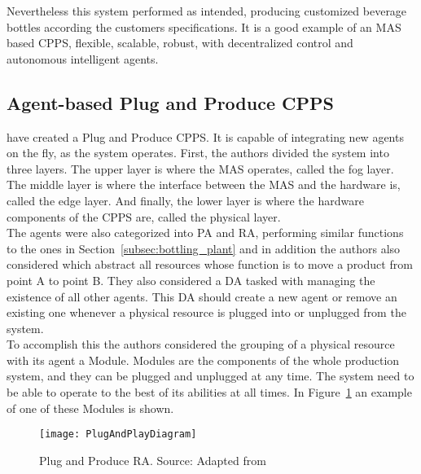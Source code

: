 Nevertheless this system performed as intended, producing customized beverage bottles according the customers specifications. It is a good example of an \acrshort{MAS} based \acrshort{CPPS}, flexible, scalable, robust, with decentralized control and autonomous intelligent agents.
 
\subsection{Agent-based Plug and Produce CPPS}
\label{agent_plug_and_produce}

\citeauthor{8972169} \cite{8972169} have created a Plug and Produce \acrshort{CPPS}. It is capable of integrating new agents on the fly, as the system operates. First, the authors divided the system into three layers. The upper layer is where the \acrshort{MAS} operates, called the fog layer. The middle layer is where the interface between the \acrshort{MAS} and the hardware is, called the edge layer. And finally, the lower layer is where the hardware components of the \acrshort{CPPS} are, called the physical layer.\\

The agents were also categorized into \acrshort{PA} and \acrshort{RA}, performing similar functions to the ones in Section~\ref{subsec:bottling_plant} and in addition the authors also considered  which abstract all resources whose function is to move a product from point A to point B. They also considered a \acrfull{DA} tasked with managing the existence of all other agents. This \acrshort{DA} should create a new agent or remove an existing one whenever a physical resource is plugged into or unplugged from the system.\\

To accomplish this the authors considered the grouping of a physical resource with its agent a Module. Modules are the components of the whole production system, and they can be plugged and unplugged at any time. The system need to be able to operate to the best of its abilities at all times. In Figure~\ref{fig:plug_and_play_device_architecture} an example of one of these Modules is shown.\\

\begin{figure}[h!]
	\centering
	\texttt{[image: PlugAndPlayDiagram]}
	\caption{Plug and Produce \acrshort{RA}. Source: Adapted from \cite{8972169}}
	\label{fig:plug_and_play_device_architecture}
\end{figure}

